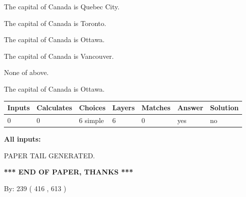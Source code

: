 \documentclass[12pt]{article}
\begin{document}
 
The capital of Canada is Quebec City.
 
 
The capital of Canada is Toronto.
 
 
The capital of Canada is Ottawa.
 
 
The capital of Canada is Vancouver.
 
 
 None of above.
 
 
\noindent{}
 
 
The capital of Canada is Ottawa.
 
 
\noindent{}
 
 
   
   
   
   
\noindent\begin{tabular}{|l|l|l|l|l|l|l|}
 \hline
Inputs & Calculates & Choices & Layers & Matches & Answer & Solution \\ \hline
 0  & 
 0  & 
 6
  simple  
  & 
 6  & 
 0  & 
  yes & 
  no 
  \\ \hline
 \end{tabular}
   
   
   
   
\noindent{}
   
   
   
   
\noindent\vspace{0.1in}\hspace{-0.08in} {\textbf{\Large{All inputs: }}}
   
   
   
   
   
   
 \vspace{0.2in}
 
   
   
\vspace{2.0in} PAPER TAIL GENERATED.
   
   
   
   
\vspace{1.0in} 
{\textbf{\large{ *** END OF PAPER, THANKS *** }}} 
   
   
\hspace{1.0in} By: 
 239 ( 416 ,  613 )
   
\end{document}
